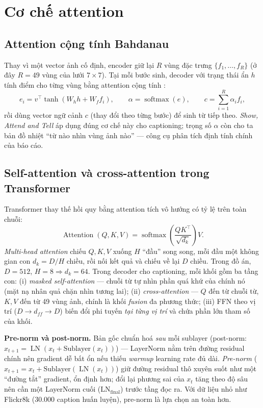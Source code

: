 \section{Cơ chế attention}

\subsection{Attention cộng tính Bahdanau}

Thay vì một vector ảnh cố định, encoder giữ lại $R$ vùng đặc trưng
$\{f_1,\dots,f_R\}$ (ở đây $R=49$ vùng của lưới $7\times 7$). Tại mỗi bước sinh,
decoder với trạng thái ẩn $h$ tính điểm cho từng vùng bằng attention cộng tính
\autocite{bahdanau2015neural}:
\begin{equation}
	e_i = v^\top \tanh\!\left(W_h h + W_f f_i\right), \qquad
	\alpha = \operatorname{softmax}(e), \qquad
	c = \sum_{i=1}^{R} \alpha_i f_i,
	\label{eq:bahdanau}
\end{equation}
rồi dùng vector ngữ cảnh $c$ (thay đổi theo từng bước) để sinh từ tiếp theo.
\emph{Show, Attend and Tell} \autocite{xu2015show} áp dụng đúng cơ chế này cho
captioning; trọng số $\alpha$ còn cho ta bản đồ nhiệt ``từ nào nhìn vùng ảnh nào''
--- công cụ phân tích định tính chính của báo cáo.

\subsection{Self-attention và cross-attention trong Transformer}

Transformer \autocite{vaswani2017attention} thay thế hồi quy bằng attention
tích vô hướng có tỷ lệ trên toàn chuỗi:
\begin{equation}
	\operatorname{Attention}(Q,K,V)
	= \operatorname{softmax}\!\left(\frac{QK^\top}{\sqrt{d_k}}\right) V.
\end{equation}
\emph{Multi-head attention} chiếu $Q,K,V$ xuống $H$ ``đầu'' song song, mỗi đầu
một không gian con $d_k = D/H$ chiều, rồi nối kết quả và chiếu về lại $D$ chiều.
Trong đồ án, $D=512$, $H=8 \Rightarrow d_k = 64$. Trong decoder cho captioning,
mỗi khối gồm ba tầng con: (i) \emph{masked self-attention} --- chuỗi từ tự nhìn
phần quá khứ của chính nó (mặt nạ nhân quả chặn nhìn tương lai);
(ii) \emph{cross-attention} --- $Q$ đến từ chuỗi từ, $K,V$ đến từ 49 vùng ảnh,
chính là khối \emph{fusion} đa phương thức; (iii) FFN theo vị trí
($D \to d_{ff} \to D$) biến đổi phi tuyến \emph{tại từng vị trí} và chứa phần
lớn tham số của khối.

\textbf{Pre-norm và post-norm.} Bản gốc chuẩn hoá \emph{sau} mỗi sublayer
(post-norm: $x_{t+1} = \operatorname{LN}(x_t + \text{Sublayer}(x_t))$) ---
LayerNorm nằm trên đường residual chính nên gradient dễ bất ổn nếu thiếu
\emph{warmup} learning rate đủ dài. \emph{Pre-norm}
($x_{t+1} = x_t + \text{Sublayer}(\operatorname{LN}(x_t))$) giữ đường residual
thô xuyên suốt như một ``đường tắt'' gradient, ổn định hơn; đổi lại phương sai
của $x_t$ tăng theo độ sâu nên cần một LayerNorm cuối
($\text{LN}_{\text{final}}$) trước tầng đọc ra. Với dữ liệu nhỏ như Flickr8k
(30.000 caption huấn luyện), pre-norm là lựa chọn an toàn hơn.


